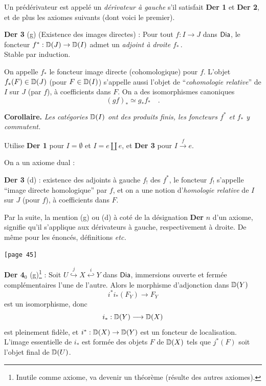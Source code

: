 \noindent Un prédérivateur est appelé un \textit{dérivateur à gauche} s'il satisfait \textbf{Der 1} et \textbf{Der 2}, et de plus les axiomes suivants (dont voici le premier).

\noindent\textbf{Der 3} (g) (Existence des images directes) : Pour tout $f : I \to J$ dans $\mathsf{Dia}$, le foncteur $f^{*} : \mathbb{D}(J) \to \mathbb{D}(I)$ admet un \textit{adjoint à droite} $f_{*}$\,.\\
Stable par induction.

On appelle $f_{*}$ le foncteur image directe (cohomologique) pour $f$. L'objet $f_{*}(F) \in \mathbb{D}(J)$ (pour $F \in \mathbb{D}(I)$) s'appelle aussi l'objet de “\textit{cohomologie relative}” de $I$ sur $J$ (par $f$), à coefficients dans $F$. On a des isomorphismes canoniques
\[ (gf)_{*} \simeq g_{*} f_{*} \quad . \]

\noindent\textbf{Corollaire.} \textit{Les catégories $\mathbb{D}(I)$ ont des produits finis, les foncteurs $f^{*}$ et $f_{*}$ y commutent.}

Utilise \textbf{Der 1} pour $I = \emptyset$ et $I = e \amalg e$, et \textbf{Der 3} pour $I \xrightarrow{f} e$.

On a un axiome dual :

\noindent\textbf{Der 3} (d) : existence des adjoints à gauche $f_{!}$ des $f^{*}$, le foncteur $f_{!}$ s'appelle “image directe homologique” par $f$, et on a une notion d'\textit{homologie relative} de $I$ sur $J$ (pour $f$), à coefficients dans $F$.

Par la suite, la mention (g) ou (d) à coté de la désignation \textbf{Der} $n$ d'un axiome, %
signifie qu'il s'applique aux dérivateurs à gauche, respectivement à droite. De même pour les énoncés, définitions \textit{etc.}

\noindent{}\texttt{[page 45]}

\noindent\textbf{Der 4}$_{0}$ (g)\footnote[13]{Inutile comme axiome, va devenir un théorème (résulte des autres axiomes).} : Soit $U \overset{j}{\hookrightarrow} X \overset{i}{\hookleftarrow} Y$ dans $\mathsf{Dia}$, immersions ouverte et fermée complémentaires l'une de l'autre. Alors le morphisme d'adjonction dans $\mathbb{D}(Y)$
\[ i^{*} i_{*}(F_{Y}) \longrightarrow F_{Y} \]
est un isomorphisme, donc
\[ i_{*} : \mathbb{D}(Y) \longrightarrow \mathbb{D}(X) \]
est pleinement fidèle, et $i^{*} : \mathbb{D}(X) \to \mathbb{D}(Y)$ est un foncteur de localisation. L'image essentielle de $i_{*}$ est formée des objets $F$ de $\mathbb{D}(X)$ tels que $j^{*}(F)$ soit l'objet final de $\mathbb{D}(U)$.



